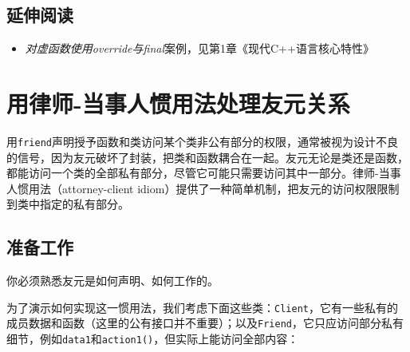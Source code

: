 
\subsection{延伸阅读}



\begin{itemize}
\item \textit{对虚函数使用override与final}案例，见第1章《现代C++语言核心特性》

\end{itemize}



\section{用律师-当事人惯用法处理友元关系}



用\texttt{friend}声明授予函数和类访问某个类非公有部分的权限，通常被视为设计不良的信号，因为友元破坏了封装，把类和函数耦合在一起。友元无论是类还是函数，都能访问一个类的全部私有部分，尽管它可能只需要访问其中一部分。律师-当事人惯用法（attorney-client idiom）提供了一种简单机制，把友元的访问权限限制到类中指定的私有部分。



\subsection{准备工作}



你必须熟悉友元是如何声明、如何工作的。



为了演示如何实现这一惯用法，我们考虑下面这些类：\texttt{Client}，它有一些私有的成员数据和函数（这里的公有接口并不重要）；以及\texttt{Friend}，它只应访问部分私有细节，例如\texttt{data1}和\texttt{action1()}，但实际上能访问全部内容：



